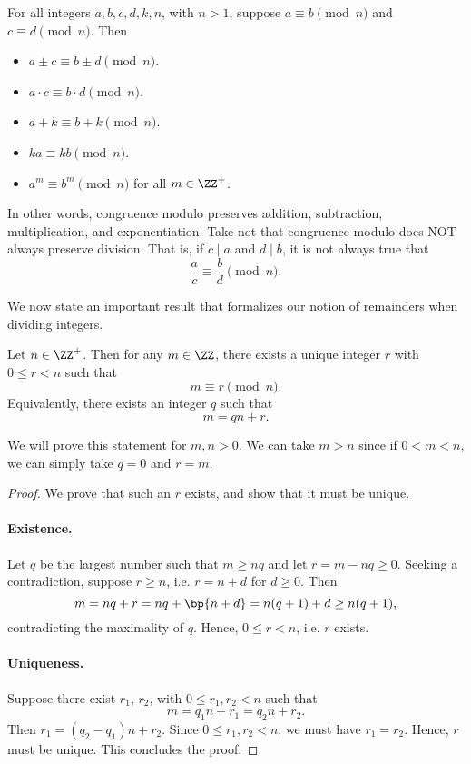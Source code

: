 \begin{proposition}
    For all integers $a, b, c, d, k, n$, with $n > 1$, suppose $a \equiv b \pmod{n}$ and $c \equiv d \pmod{n}$. Then
    \begin{itemize}
        \item $a \pm c \equiv b \pm d \pmod{n}$.
        \item $a \cdot c \equiv b \cdot d \pmod{n}$.
        \item $a + k \equiv b + k \pmod{n}$.
        \item $ka \equiv kb \pmod{n}$.
        \item $a^m \equiv b^m \pmod{n}$ for all $m \in \ZZ^+$.
    \end{itemize}
\end{proposition}

In other words, congruence modulo preserves addition, subtraction, multiplication, and exponentiation. Take not that congruence modulo does NOT always preserve division. That is, if $c \mid a$ and $d \mid b$, it is not always true that \[\frac{a}{c} \equiv \frac{b}{d} \pmod{n}.\]

We now state an important result that formalizes our notion of remainders when dividing integers.

\begin{lemma}
    Let $n \in \ZZ^+$. Then for any $m \in \ZZ$, there exists a unique integer $r$ with $0 \leq r < n$ such that \[m \equiv r \pmod{n}.\] Equivalently, there exists an integer $q$ such that \[m = qn + r.\]
\end{lemma}
We will prove this statement for $m, n > 0$. We can take $m > n$ since if $0 < m < n$, we can simply take $q = 0$ and $r = m$.
\begin{proof}
    We prove that such an $r$ exists, and show that it must be unique.

    \item\paragraph{Existence.} Let $q$ be the largest number such that $m \geq nq$ and let $r = m - nq \geq 0$. Seeking a contradiction, suppose $r \geq n$, i.e. $r = n + d$ for $d \geq 0$. Then \[m = nq + r = nq + \bp{n + d} = n(q+1) + d \geq n(q+1),\] contradicting the maximality of $q$. Hence, $0 \leq r < n$, i.e. $r$ exists.

    \item\paragraph{Uniqueness.} Suppose there exist $r_1$, $r_2$, with $0 \leq r_1, r_2 < n$ such that \[m = q_1 n + r_1 = q_2 n + r_2.\] Then $r_1 = (q_2 - q_1) n + r_2$. Since $0 \leq r_1, r_2 < n$, we must have $r_1 = r_2$. Hence, $r$ must be unique. This concludes the proof.
\end{proof}

